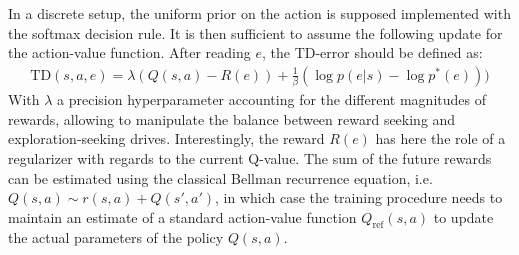 \documentclass[runningheads]{llncs}
\begin{document}
In a discrete setup, the uniform prior on the action is supposed implemented with the softmax decision rule. It is then sufficient to assume the following update for the action-value function.
After reading $e$, %
the TD-error should be defined as:
\begin{align}\label{eq:var-RL-lambda}
\text{TD}(s,a,e) = \lambda(Q(s,a) - R(e)) + \frac{1}{\beta} (\log p(e|s) - \log p^*(e)))
\end{align}
With $\lambda$ a precision hyperparameter accounting for the different magnitudes of rewards, allowing to manipulate the balance between reward seeking and exploration-seeking drives.
Interestingly, the reward $R(e)$ has here the role of a regularizer with regards to the current Q-value. The sum of the future rewards can be estimated using the classical Bellman recurrence equation, i.e. $Q(s,a) \sim r(s,a) + Q(s', a')$, in which case the training procedure needs to maintain an estimate of a standard action-value function $Q_\text{ref}(s,a)$ to update the actual parameters of the policy $Q(s,a)$.  








\end{document}
